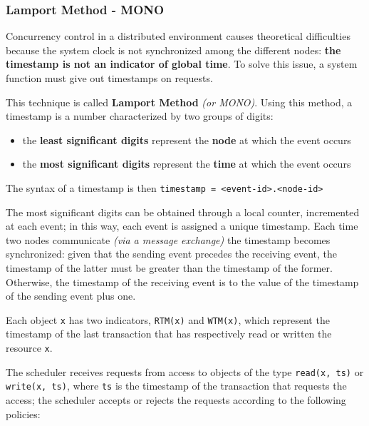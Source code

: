 \documentclass[english]{article}
\begin{document}
\subsubsection{Lamport Method - \ts MONO}

Concurrency control in a distributed environment causes theoretical difficulties because the system clock is not synchronized among the different nodes:
\textbf{the timestamp is not an indicator of global time}.
To solve this issue, a system function must give out timestamps on requests.

This technique is called \textbf{Lamport Method} \textit{(or \ts MONO)}.
Using this method, a timestamp is a number characterized by two groups of digits:

\begin{itemize}
  \item the \textbf{least significant digits} represent the \textbf{node} at which the event occurs
  \item the \textbf{most significant digits} represent the \textbf{time} at which the event occurs
\end{itemize}

The syntax of a timestamp is then \texttt{timestamp = <event-id>.<node-id>}

\bigskip
The most significant digits can be obtained through a local counter, incremented at each event; in this way, each event is assigned a unique timestamp.
Each time two nodes communicate \textit{(via a message exchange)} the timestamp becomes synchronized: given that the sending event precedes the receiving event, the timestamp of the latter must be greater than the timestamp of the former.
Otherwise, the timestamp of the receiving event is  to the value of the timestamp of the sending event plus one.

\bigskip
Each object \texttt{x} has two indicators, \texttt{RTM(x)} and \texttt{WTM(x)}, which represent the timestamp of the last transaction that has respectively read or written the resource \texttt{x}.

The scheduler receives requests from access to objects of the type \texttt{read(x, ts)} or \texttt{write(x, ts)}, where \texttt{ts} is the timestamp of the transaction that requests the access; the scheduler accepts or rejects the requests according to the following policies:
\end{document}
